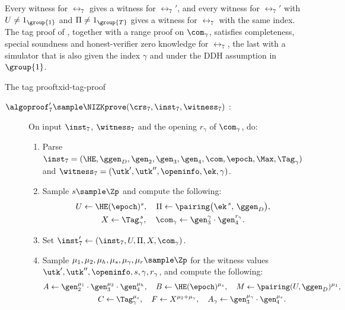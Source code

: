 \begin{lemma}\label{lem:txid-rel7} Every witness for $\rel_7$ gives a witness
for $\rel_7'$, and every witness for $\rel_7'$ with $U \neq 1_{\group{1}}$ and
$\Pi \neq 1_{\group{T}}$ gives a witness for $\rel_7$ with the same index. The
tag proof of , together with a range proof on
$\com_\gamma$, satisfies completeness, special soundness and honest-verifier
zero knowledge for $\rel_7$, the last with a simulator that is also given the
index $\gamma$ and under the DDH assumption in $\group{1}$.
\end{lemma}

\begin{protocolbox}{The tag proof}{txid-tag-proof}

  \begin{description}

    \item[$\algoproof_7' \sample \NIZKprove(\crs_7, \inst_7, \witness_7)$ :]
On input $\inst_7$, $\witness_7$ and the opening $r_\gamma$ of $\com_\gamma$,
do:

      \begin{enumerate}

	\item Parse $\inst_7 = (\HE, \ggen_D, \gen_2, \gen_3, \gen_4, \com,
\epoch, \Max, \Tag_\gamma)$ and $\witness_7 = (\utk', \utk'', \openinfo,
\ek, \gamma)$.

	\item Sample $s \sample \Zp$ and compute the following:
	  \begin{gather*}
	    U \leftarrow \HE(\epoch)^s, \quad \Pi \leftarrow
\pairing\big(\ek^{\,s},\, \ggen_D\big), \\ X \leftarrow
\Tag_\gamma^{\,s}, \quad \com_\gamma \leftarrow
\gen_3^{\gamma}\cdot\gen_4^{r_\gamma}.
	  \end{gather*}

	\item Set $\inst_7' \leftarrow (\inst_7, U, \Pi, X, \com_\gamma)$.

	\item Sample $\mu_1, \mu_2, \mu_h, \mu_s, \mu_\gamma, \mu_r \sample
\Zp$ for the witness values $\utk', \utk'', \openinfo, s, \gamma, r_\gamma$,
and compute the following:
	  \begin{gather*}
	    A \leftarrow \gen_2^{\mu_1}\cdot\gen_3^{\mu_2}\cdot\gen_4^{\mu_h},
\quad B \leftarrow \HE(\epoch)^{\mu_s}, \quad M \leftarrow
\pairing(U,\ggen_D)^{\mu_1}, \\
	    C \leftarrow \Tag_\gamma^{\mu_s}, \quad F \leftarrow X^{\mu_2 +
\mu_\gamma}, \quad A_\gamma \leftarrow \gen_3^{\mu_\gamma}\cdot\gen_4^{\mu_r}.
	  \end{gather*}


\end{enumerate}
\end{description}
\end{protocolbox}
